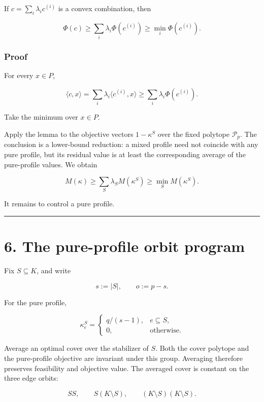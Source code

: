 \documentclass[
  11pt,
]{article}
\begin{document}
If \(c=\sum_i\lambda_ic^{(i)}\) is a convex combination, then

\[
\Phi(c)
\ge
\sum_i\lambda_i\Phi(c^{(i)})
\ge
\min_i\Phi(c^{(i)}).
\]

\subsubsection{Proof}\label{proof-1}

For every \(x\in P\),

\[
\langle c,x\rangle
=
\sum_i\lambda_i\langle c^{(i)},x\rangle
\ge
\sum_i\lambda_i\Phi(c^{(i)}).
\]

Take the minimum over \(x\in P\).

Apply the lemma to the objective vectors \(1-\kappa^S\) over the fixed
polytope \(\mathcal P_p\). The conclusion is a lower-bound reduction: a
mixed profile need not coincide with any pure profile, but its residual
value is at least the corresponding average of the pure-profile values.
We obtain

\[
\boxed{
M(\kappa)
\ge
\sum_S\lambda_SM(\kappa^S)
\ge
\min_SM(\kappa^S).
}
\tag{5.4}
\]

It remains to control a pure profile.

\begin{center}\rule{0.5\linewidth}{0.5pt}\end{center}

\section{6. The pure-profile orbit
program}\label{the-pure-profile-orbit-program}

Fix \(S\subseteq K\), and write

\[
s:=|S|,
\qquad
o:=p-s.
\]

For the pure profile,

\[
\kappa_e^S
=
\begin{cases}
q/(s-1),&e\subseteq S,\\
0,&\text{otherwise}.
\end{cases}
\tag{6.1}
\]

Average an optimal cover over the stabilizer of \(S\). Both the cover
polytope and the pure-profile objective are invariant under this group.
Averaging therefore preserves feasibility and objective value. The
averaged cover is constant on the three edge orbits:

\[
SS,\qquad
S(K\setminus S),\qquad
(K\setminus S)(K\setminus S).
\]
\end{document}
